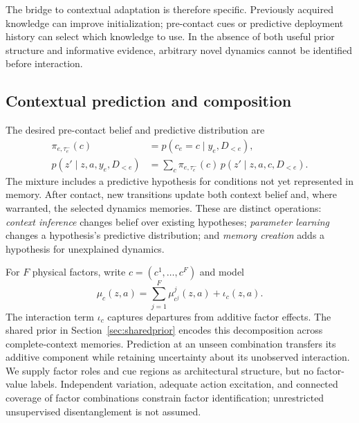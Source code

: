 The bridge to contextual adaptation is therefore specific. Previously acquired knowledge can improve initialization; pre-contact cues or predictive deployment history can select which knowledge to use. In the absence of both useful prior structure and informative evidence, arbitrary novel dynamics cannot be identified before interaction.

\subsection{Contextual prediction and composition}
The desired pre-contact belief and predictive distribution are
\begin{align}
\pi_{e,\tau_e^-}(c)&=p(c_e=c\mid y_e,D_{<e}),\label{eq:initialposterior}\\
p(z'\mid z,a,y_e,D_{<e})&=\sum_c\pi_{e,\tau_e^-}(c)\,p(z'\mid z,a,c,D_{<e}).\label{eq:mixture}
\end{align}
The mixture includes a predictive hypothesis for conditions not yet represented in memory. After contact, new transitions update both context belief and, where warranted, the selected dynamics memories. These are distinct operations: \emph{context inference} changes belief over existing hypotheses; \emph{parameter learning} changes a hypothesis's predictive distribution; and \emph{memory creation} adds a hypothesis for unexplained dynamics.

For $F$ physical factors, write $c=(c^1,\ldots,c^F)$ and model
\begin{equation}\label{eq:composition}
\mu_c(z,a)=\sum_{j=1}^{F}\mu^{j}_{c^j}(z,a)+\iota_c(z,a).
\end{equation}
The interaction term $\iota_c$ captures departures from additive factor effects. The shared prior in Section~\ref{sec:sharedprior} encodes this decomposition across complete-context memories. Prediction at an unseen combination transfers its additive component while retaining uncertainty about its unobserved interaction. We supply factor roles and cue regions as architectural structure, but no factor-value labels. Independent variation, adequate action excitation, and connected coverage of factor combinations constrain factor identification; unrestricted unsupervised disentanglement is not assumed.
